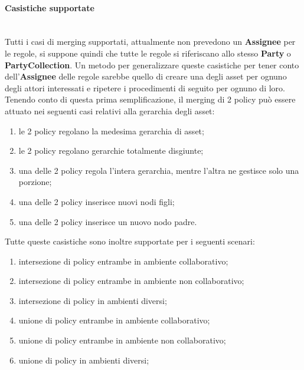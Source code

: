 \documentclass[12pt,a4paper,twoside]{book}
\begin{document}
\paragraph{Casistiche supportate}\mbox{}\\
Tutti i casi di merging supportati, attualmente non prevedono un \textbf{Assignee} per le regole, si suppone quindi che tutte le regole si riferiscano allo stesso \textbf{Party} o \textbf{PartyCollection}. Un metodo per generalizzare queste casistiche per tener conto dell'\textbf{Assignee} delle regole sarebbe quello di creare una degli asset per ognuno degli attori interessati e ripetere i procedimenti di seguito per ognuno di loro.\\
Tenendo conto di questa prima semplificazione, il merging di 2 policy può essere attuato nei seguenti casi relativi alla gerarchia degli asset:
\begin{enumerate}
	\item le 2 policy regolano la medesima gerarchia di asset;
	\item le 2 policy regolano gerarchie totalmente disgiunte;
	\item una delle 2 policy regola l'intera gerarchia, mentre l'altra ne gestisce solo una porzione;
	\item una delle 2 policy inserisce nuovi nodi figli;
	\item una delle 2 policy inserisce un nuovo nodo padre.
\end{enumerate}
Tutte queste casistiche sono inoltre supportate per i seguenti scenari:
\begin{enumerate}
	\item intersezione di policy entrambe in ambiente collaborativo;
	\item intersezione di policy entrambe in ambiente non collaborativo;
	\item intersezione di policy in ambienti diversi;
	\item unione di policy entrambe in ambiente collaborativo;
	\item unione di policy entrambe in ambiente non collaborativo;
	\item unione di policy in ambienti diversi;
\end{enumerate}
\end{document}
